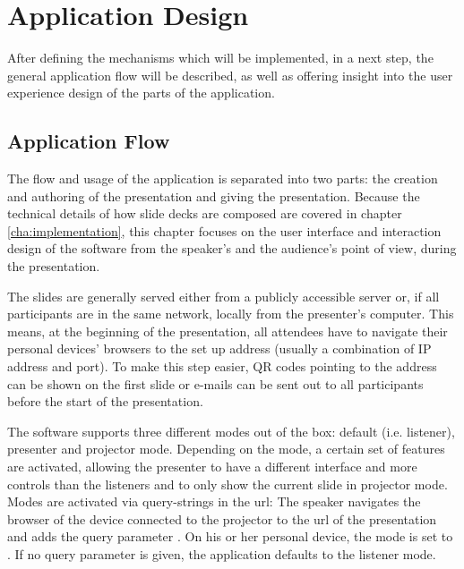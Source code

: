 \chapter{Application Design}
\label{cha:design}

After defining the mechanisms which will be implemented, in a next step, the general application flow will be described, as well as offering insight into the user experience design of the parts of the application.

\section{Application Flow}
The flow and usage of the application is separated into two parts: the creation and authoring of the presentation and giving the presentation. Because the technical details of how slide decks are composed are covered in chapter \ref{cha:implementation}, this chapter focuses on the user interface and interaction design of the software from the speaker's and the audience's point of view, during the presentation.

The slides are generally served either from a publicly accessible server or, if all participants are in the same network, locally from the presenter's computer. This means, at the beginning of the presentation, all attendees have to navigate their personal devices' browsers to the set up address (usually a combination of IP address and port). To make this step easier, QR codes pointing to the address can be shown on the first slide or e-mails can be sent out to all participants before the start of the presentation.

The software supports three different modes out of the box: default (i.e. listener), presenter and projector mode. Depending on the mode, a certain set of features are activated, allowing the presenter to have a different interface and more controls than the listeners and to only show the current slide in projector mode. Modes are activated via query-strings in the url: The speaker navigates the browser of the device connected to the projector to the url of the presentation and adds the query parameter . On his or her personal device, the mode is set to . If no query parameter is given, the application defaults to the listener mode.




